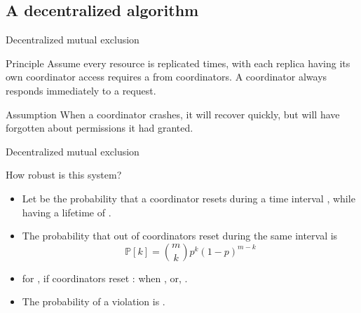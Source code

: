 \subsection{A decentralized algorithm}
\begin{frame}{Decentralized mutual exclusion}
  \begin{block}{Principle}
    Assume every resource is replicated  times, with each replica having its own coordinator
    \mathexpr{\Rightarrow} access requires a  from  coordinators. A
    coordinator always responds immediately to a request.
  \end{block}
  \begin{block}{Assumption}
    When a coordinator crashes, it will recover quickly, but will have forgotten about permissions it had
    granted.
  \end{block}
\end{frame}
\begin{frame}{Decentralized mutual exclusion}
  \begin{block}{How robust is this system?}
    \begin{itemize}
      \item Let  be the probability that a coordinator resets during a time interval
            , while having a lifetime of .
      \item The probability  that
             out of  coordinators reset during the same interval is
            \[
              \mathbb{P}[k] = \binom{m}{k} p^k (1 - p)^{m-k}
            \]
      \item for , if  coordinators reset \mathexpr{\Rightarrow} : when , or, .
      \item The probability of a violation is .
    \end{itemize}
  \end{block}
\end{frame}
